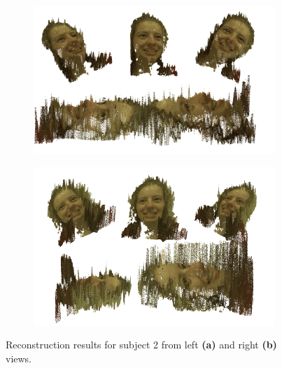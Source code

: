 \documentclass[journal]{IEEEtran}
\begin{document}
\begin{figure}
    \centering
    \begin{subfigure}[t]{\linewidth}
        \centering
        \includegraphics[width=\linewidth]{result_S2_R}
		\caption{}
		\label{fig:result_S2_R}
    \end{subfigure}
    
    \begin{subfigure}[t]{\linewidth}
        \centering
		\includegraphics[width=\linewidth]{result_S2_L}
		\caption{}
		\label{fig:result_S2_L}
    \end{subfigure}
    \caption{Reconstruction results for subject 2 from left \textbf{(a)} and right \textbf{(b)} views.}
    \label{fig:results_S2-reconstruction}
\end{figure}
\end{document}
